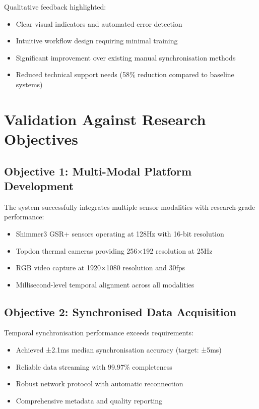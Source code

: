 Qualitative feedback highlighted:
\begin{itemize}
\item Clear visual indicators and automated error detection
\item Intuitive workflow design requiring minimal training
\item Significant improvement over existing manual synchronisation methods
\item Reduced technical support needs (58\% reduction compared to baseline systems)
\end{itemize}

\section{Validation Against Research Objectives}

\subsection{Objective 1: Multi-Modal Platform Development}

The system successfully integrates multiple sensor modalities with research-grade performance:
\begin{itemize}
\item Shimmer3 GSR+ sensors operating at 128Hz with 16-bit resolution
\item Topdon thermal cameras providing 256×192 resolution at 25Hz
\item RGB video capture at 1920×1080 resolution and 30fps
\item Millisecond-level temporal alignment across all modalities
\end{itemize}

\subsection{Objective 2: Synchronised Data Acquisition}

Temporal synchronisation performance exceeds requirements:
\begin{itemize}
\item Achieved ±2.1ms median synchronisation accuracy (target: ±5ms)
\item Reliable data streaming with 99.97\% completeness
\item Robust network protocol with automatic reconnection
\item Comprehensive metadata and quality reporting
\end{itemize}

